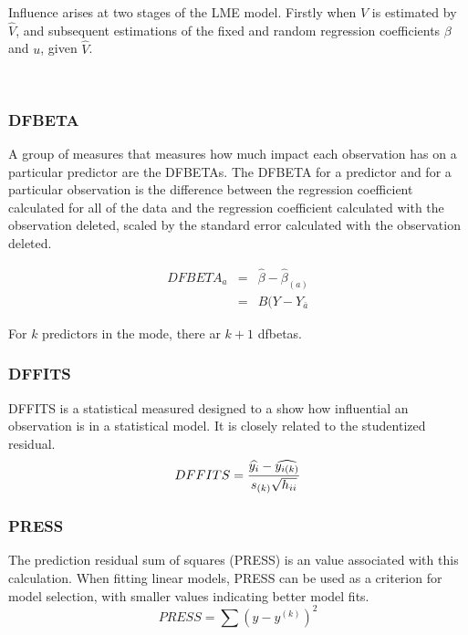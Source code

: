 \documentclass[residuals.tex]{subfiles}
\begin{document}
Influence arises at two stages of the LME model. Firstly when $V$ is estimated by $\hat{V}$, and subsequent
estimations of the fixed and random regression coefficients $\beta$ and $u$, given $\hat{V}$.

\

\subsubsection{DFBETA}
A group of measures that measures how much impact each observation has on a particular predictor are the DFBETAs. The DFBETA for a predictor and for a particular observation is the difference between the regression coefficient calculated for all of the data and the regression coefficient calculated with the observation deleted,  scaled by the standard error calculated with the observation deleted.

\begin{eqnarray}
DFBETA_{a} &=& \hat{\beta} - \hat{\beta}_{(a)} \\
&=& B(Y-Y_{\bar{a}}
\end{eqnarray}

For $k$ predictors in the mode, there ar $k+1$ dfbetas.



\subsubsection{DFFITS} %
DFFITS is a statistical measured designed to a show how influential an observation is in a statistical model. It is closely related to the studentized residual.
\begin{displaymath} DFFITS = {\widehat{y_i} -
	\widehat{y_{i(k)}} \over s_{(k)} \sqrt{h_{ii}}} \end{displaymath}


\subsubsection{PRESS} %
The prediction residual sum of squares (PRESS) is an value associated with this calculation. When fitting linear models, PRESS can be used as a criterion for model selection, with smaller values indicating better model fits.
\begin{equation}
PRESS = \sum(y-y^{(k)})^2
\end{equation}
\end{document}
